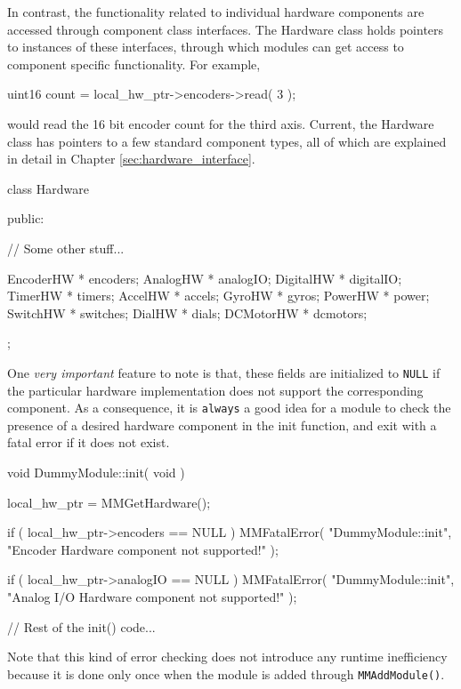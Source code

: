 In contrast, the functionality related to individual hardware components are
accessed through component class interfaces. The Hardware class holds
pointers to instances of these interfaces, through which modules can get
access to component specific functionality. For example, 

\begin{codesegment}
  uint16 count = local_hw_ptr->encoders->read( 3 );
\end{codesegment}

\noindent would read the 16 bit encoder count for the third axis. Current,
the Hardware class has pointers to a few standard component types, all of
which are explained in detail in Chapter \ref{sec:hardware_interface}.

\begin{classdef}
class Hardware {
public:

  // Some other stuff...

  EncoderHW   * encoders;
  AnalogHW    * analogIO;
  DigitalHW   * digitalIO;
  TimerHW     * timers;
  AccelHW     * accels;
  GyroHW      * gyros;
  PowerHW     * power;
  SwitchHW    * switches;
  DialHW      * dials;
  DCMotorHW   * dcmotors;
};
\end{classdef}

One {\em very important} feature to note is that, these fields are
initialized to {\tt NULL} if the particular hardware implementation does not
support the corresponding component. As a consequence, it is {\tt always} a
good idea for a module to check the presence of a desired hardware component
in the init function, and exit with a fatal error if it does not exist.

\begin{codesegment}
void DummyModule::init( void ) {

  local_hw_ptr = MMGetHardware();

  if ( local_hw_ptr->encoders == NULL )
    MMFatalError( "DummyModule::init", 
                  "Encoder Hardware component not supported!" );

  if ( local_hw_ptr->analogIO == NULL )
    MMFatalError( "DummyModule::init", 
                  "Analog I/O Hardware component not supported!" );

  // Rest of the init() code...
}
\end{codesegment}

Note that this kind of error checking does not introduce any runtime
inefficiency because it is done only once when the module is added through
{\tt MMAddModule()}.

